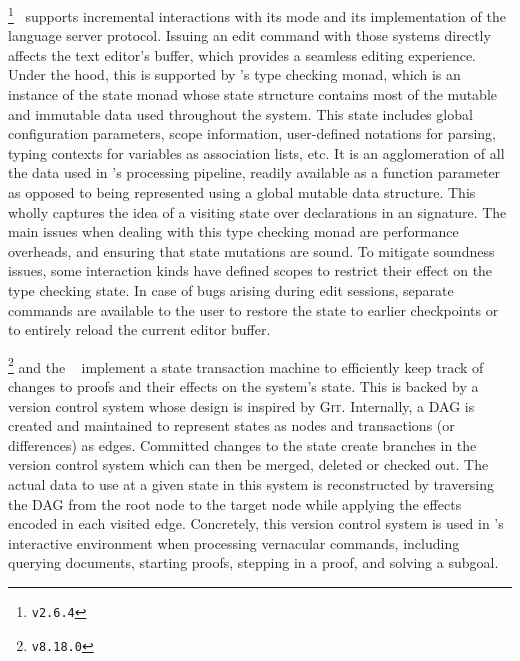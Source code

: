 \Agda\footnote{\Agda \texttt{v2.6.4}}~\cite{clffolp, norell2007towards, agda2023} supports incremental interactions with its \Agda mode and its implementation of the language server protocol.
Issuing an edit command with those systems directly affects the text editor's buffer, which provides a seamless editing experience.
Under the hood, this is supported by \Agda's type checking monad, which is an instance of the state monad whose state structure contains most of the mutable and immutable data used throughout the system.
This state includes global configuration parameters, scope information, user-defined notations for parsing, typing contexts for variables as association lists, etc.
It is an agglomeration of all the data used in \Agda's processing pipeline, readily available as a function parameter as opposed to being represented using a global mutable data structure.
This wholly captures the idea of a visiting state over declarations in an \Agda signature.
The main issues when dealing with this type checking monad are performance overheads, and ensuring that state mutations are sound.
To mitigate soundness issues, some interaction kinds have defined scopes to restrict their effect on the type checking state.
In case of bugs arising during edit sessions, separate commands are available to the user to restore the state to earlier checkpoints or to entirely reload the current editor buffer.

\Coq\footnote{\Coq \texttt{v8.18.0}} and the \CoqIDE~\cite{Coq, bertot2013interactive} implement a state transaction machine to efficiently keep track of changes to proofs and their effects on the system's state.
This is backed by a version control system whose design is inspired by \textsc{Git}.
Internally, a \ac{DAG} is created and maintained to represent states as nodes and transactions (or differences) as edges.
Committed changes to the state create branches in the version control system which can then be merged, deleted or checked out.
The actual data to use at a given state in this system is reconstructed by traversing the \ac{DAG} from the root node to the target node while applying the effects encoded in each visited edge.
Concretely, this version control system is used in \Coq's interactive environment when processing vernacular commands, including querying documents, starting proofs, stepping in a proof, and solving a subgoal.


